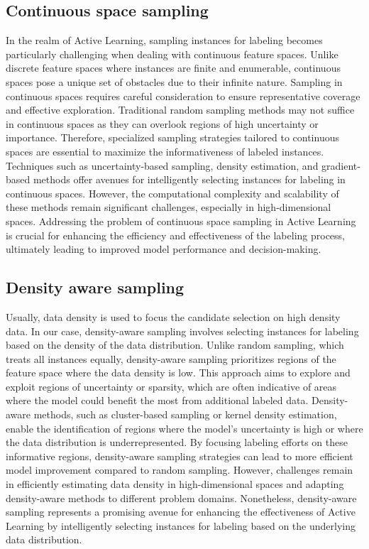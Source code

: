 \documentclass[11pt]{article}
\begin{document}
\subsection{Continuous space sampling}
In the realm of Active Learning, sampling instances for labeling becomes particularly challenging when dealing with continuous feature spaces. Unlike discrete feature spaces where instances are finite and enumerable, continuous spaces pose a unique set of obstacles due to their infinite nature. Sampling in continuous spaces requires careful consideration to ensure representative coverage and effective exploration. Traditional random sampling methods may not suffice in continuous spaces as they can overlook regions of high uncertainty or importance. Therefore, specialized sampling strategies tailored to continuous spaces are essential to maximize the informativeness of labeled instances. Techniques such as uncertainty-based sampling, density estimation, and gradient-based methods offer avenues for intelligently selecting instances for labeling in continuous spaces. However, the computational complexity and scalability of these methods remain significant challenges, especially in high-dimensional spaces. Addressing the problem of continuous space sampling in Active Learning is crucial for enhancing the efficiency and effectiveness of the labeling process, ultimately leading to improved model performance and decision-making.

\subsection{Density aware sampling}
Usually, data density is used to focus the candidate selection on high density data\cite{settles_analysis_2008}.
In our case, density-aware sampling involves selecting instances for labeling based on the density of the data distribution. Unlike random sampling, which treats all instances equally, density-aware sampling prioritizes regions of the feature space where the data density is low. This approach aims to explore and exploit regions of uncertainty or sparsity, which are often indicative of areas where the model could benefit the most from additional labeled data. Density-aware methods, such as cluster-based sampling or kernel density estimation, enable the identification of regions where the model's uncertainty is high or where the data distribution is underrepresented. By focusing labeling efforts on these informative regions, density-aware sampling strategies can lead to more efficient model improvement compared to random sampling. However, challenges remain in efficiently estimating data density in high-dimensional spaces and adapting density-aware methods to different problem domains. Nonetheless, density-aware sampling represents a promising avenue for enhancing the effectiveness of Active Learning by intelligently selecting instances for labeling based on the underlying data distribution.
\end{document}
